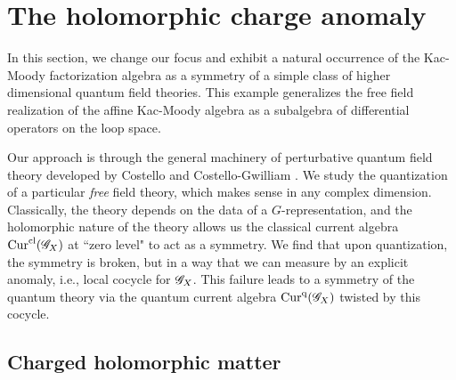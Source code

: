 \section{The holomorphic charge anomaly} \label{sec: qft}

In this section, we change our focus and exhibit a natural occurrence of the Kac-Moody factorization algebra as a symmetry of a simple class of higher dimensional quantum field theories. 
This example generalizes the free field realization of the affine Kac-Moody algebra as a subalgebra of differential operators on the loop space. 

Our approach is through the general machinery of perturbative quantum field theory developed by Costello \cite{CosRenorm} and Costello-Gwilliam \cite{CG1,CG2}.
We study the quantization of a particular {\em free} field theory, which makes sense in any complex dimension.
Classically, the theory depends on the data of a $G$-representation, and the holomorphic nature of the theory allows us the classical current algebra ${\rm Cur}^{{\rm cl}}(\mathscr G_X)$ at ``zero level" to act as a symmetry. 
We find that upon quantization, the symmetry is broken, but in a way that we can measure by an explicit anomaly, i.e., local cocycle for $\mathscr G_X$. 
This failure leads to a symmetry of the quantum theory via the quantum current algebra ${\rm Cur}^{{\rm q}}(\mathscr G_X)$ twisted by this cocycle.  
 
%
%
%

\subsection{Charged holomorphic matter}

